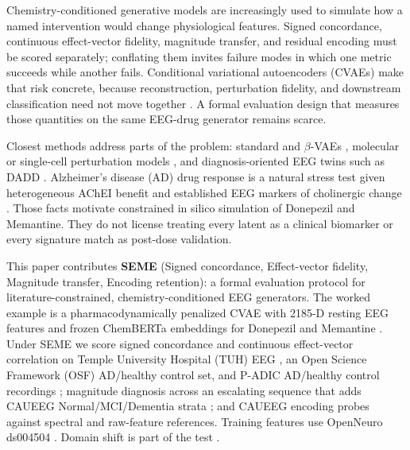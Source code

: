 Chemistry-conditioned generative models are increasingly used to simulate how a named intervention would change physiological features. Signed concordance, continuous effect-vector fidelity, magnitude transfer, and residual encoding must be scored separately; conflating them invites failure modes in which one metric succeeds while another fails. Conditional variational autoencoders (CVAEs) make that risk concrete, because reconstruction, perturbation fidelity, and downstream classification need not move together \citep{Kingma2014VAE,Higgins2017betaVAE,Rampasek2019DrVAE,Lotfollahi2019scGen}. A formal evaluation design that measures those quantities on the same EEG-drug generator remains scarce.

Closest methods address parts of the problem: standard and \(\beta\)-VAEs \citep{Kingma2014VAE,Higgins2017betaVAE}, molecular or single-cell perturbation models \citep{Rampasek2019DrVAE,Lotfollahi2019scGen}, and diagnosis-oriented EEG twins such as DADD \citep{Amato2025DADD,Amato2026DADDnpj}. Alzheimer's disease (AD) drug response is a natural stress test given heterogeneous AChEI benefit and established EEG markers of cholinergic change \citep{Lu2020DonepezilGenetics,Pozzi2022AChEIPredictors,Jeong2004EEGreview,Cassani2018EEGADReview,Babiloni2006DonepezilEEG}. Those facts motivate constrained in silico simulation of Donepezil and Memantine. They do not license treating every latent as a clinical biomarker or every signature match as post-dose validation.

This paper contributes \textbf{SEME} (Signed concordance, Effect-vector fidelity, Magnitude transfer, Encoding retention): a formal evaluation protocol for literature-constrained, chemistry-conditioned EEG generators. The worked example is a pharmacodynamically penalized CVAE with 2185-D resting EEG features and frozen ChemBERTa embeddings for Donepezil and Memantine \citep{Chithrananda2020ChemBERTa,Winblad2007Memantine}. Under SEME we score signed concordance and continuous effect-vector correlation on Temple University Hospital (TUH) EEG \citep{Obeid2016TUH}, an Open Science Framework (OSF) AD/healthy control set, and P-ADIC AD/healthy control recordings \citep{Shor2021PADIC}; magnitude diagnosis across an escalating sequence that adds CAUEEG Normal/MCI/Dementia strata \citep{Kim2023CAUEEG}; and CAUEEG encoding probes against spectral and raw-feature references. Training features use OpenNeuro ds004504 \citep{Miltiadous2023OpenNeuro}. Domain shift is part of the test \citep{Gulrajani2021DomainShift}.


